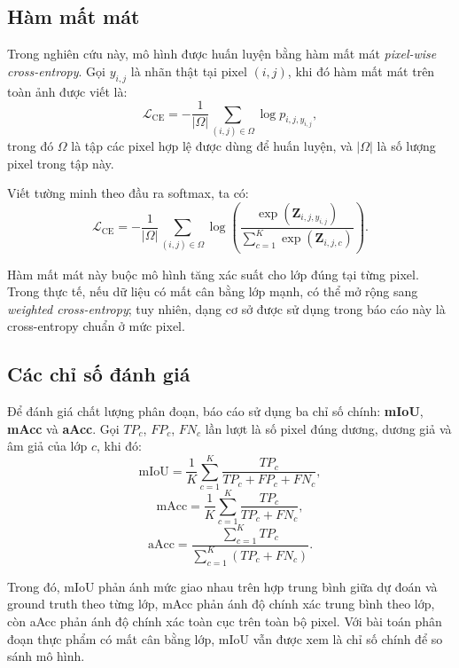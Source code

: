 \subsection{Hàm mất mát}

Trong nghiên cứu này, mô hình được huấn luyện bằng hàm mất mát \textit{pixel-wise cross-entropy}. Gọi $y_{i,j}$ là nhãn thật tại pixel $(i,j)$, khi đó hàm mất mát trên toàn ảnh được viết là:
\[
\mathcal{L}_{\mathrm{CE}}
=
-\frac{1}{|\Omega|}
\sum_{(i,j)\in\Omega}
\log p_{i,j,y_{i,j}},
\]
trong đó $\Omega$ là tập các pixel hợp lệ được dùng để huấn luyện, và $|\Omega|$ là số lượng pixel trong tập này.

Viết tường minh theo đầu ra softmax, ta có:
\[
\mathcal{L}_{\mathrm{CE}}
=
-\frac{1}{|\Omega|}
\sum_{(i,j)\in\Omega}
\log
\left(
\frac{\exp(\mathbf{Z}_{i,j,y_{i,j}})}
{\sum_{c=1}^{K}\exp(\mathbf{Z}_{i,j,c})}
\right).
\]

Hàm mất mát này buộc mô hình tăng xác suất cho lớp đúng tại từng pixel. Trong thực tế, nếu dữ liệu có mất cân bằng lớp mạnh, có thể mở rộng sang \textit{weighted cross-entropy}; tuy nhiên, dạng cơ sở được sử dụng trong báo cáo này là cross-entropy chuẩn ở mức pixel.

\subsection{Các chỉ số đánh giá}

Để đánh giá chất lượng phân đoạn, báo cáo sử dụng ba chỉ số chính: \textbf{mIoU}, \textbf{mAcc} và \textbf{aAcc}. Gọi $TP_c$, $FP_c$, $FN_c$ lần lượt là số pixel đúng dương, dương giả và âm giả của lớp $c$, khi đó:
\[
\mathrm{mIoU}=\frac{1}{K}\sum_{c=1}^{K}\frac{TP_c}{TP_c+FP_c+FN_c},
\]
\[
\mathrm{mAcc}=\frac{1}{K}\sum_{c=1}^{K}\frac{TP_c}{TP_c+FN_c},
\]
\[
\mathrm{aAcc}=\frac{\sum_{c=1}^{K}TP_c}{\sum_{c=1}^{K}(TP_c+FN_c)}.
\]

Trong đó, mIoU phản ánh mức giao nhau trên hợp trung bình giữa dự đoán và ground truth theo từng lớp, mAcc phản ánh độ chính xác trung bình theo lớp, còn aAcc phản ánh độ chính xác toàn cục trên toàn bộ pixel. Với bài toán phân đoạn thực phẩm có mất cân bằng lớp, mIoU vẫn được xem là chỉ số chính để so sánh mô hình.